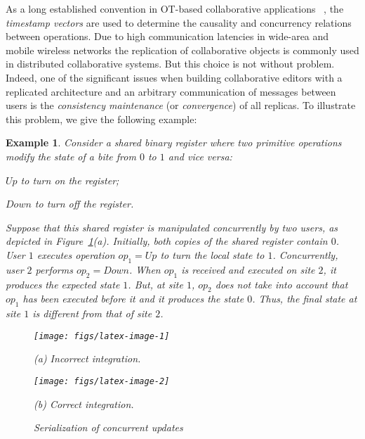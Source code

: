 \documentclass[submission,copyright,creativecommons]{eptcs}
\newtheorem{example}{Example}
\begin{document}
As a long established convention in OT-based
collaborative applications~\cite{Ellis89, Sun.ea:98}
, the
\emph{timestamp vectors} are used to determine the causality and
concurrency relations between operations.
Due to high  communication latencies in wide-area  and  mobile
wireless  networks the replication of collaborative objects is commonly
used in distributed collaborative systems. But this choice is not
without problem. Indeed, one  of the  significant  issues when  building collaborative
editors with a replicated  architecture and an arbitrary communication
of messages between users  is the \textit{consistency maintenance} (or
\textit{convergence})  of all  replicas. To  illustrate  this problem,
we give the following example:

\begin{example}\label{exmp:upDown}
Consider a shared binary register where two primitive operations modify the state of a bite from $0$ to $1$ and vice versa:
\begin{inparaenum}[(i)]
\item $Up$ to turn on the register;
\item $Down$ to turn off the register.
\end{inparaenum}
Suppose that this shared register is manipulated concurrently by two users, as depicted in
Figure~\ref{fig:div}(a). Initially, both copies of the shared register contain $0$.
User   $1$  executes  operation  $op_1 =  Up$  to turn the local state to $1$.  Concurrently, user  $2$   performs  $op_2  =  Down$.   When  $op_1$  is  received  and
executed   on   site   $2$,   it  produces   the   expected   state $1$.  But,  at  site $1$, $op_2$
does not take  into account that $op_1$ has  been executed before it
  and it produces the  state $0$.  Thus, the final state at site
  $1$  is different  from that of  site $2$.

\begin{figure}[h!]
\begin{minipage}[t]{0.45\linewidth}
\centerline{\texttt{[image: figs/latex-image-1]}}
\centerline{(a) Incorrect integration.}
\end{minipage}
 \hspace{.75cm}
 \begin{minipage}[t]{0.45\linewidth}
\centerline{\texttt{[image: figs/latex-image-2]}}
\centerline{(b) Correct integration.}
\end{minipage}
\caption{Serialization of concurrent updates}\label{fig:div}
\vspace{-5mm}
\end{figure}


\end{example}
\end{document}

